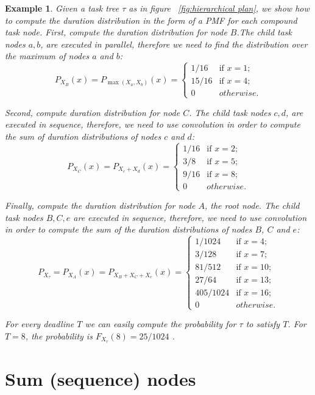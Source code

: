 \documentclass[review]{elsarticle}
\newtheorem{example}{Example}
\begin{document}
\begin{example}

Given a task tree $\tau$ as in figure ~\ref{fig:hierarchical plan}, we show how to compute the duration distribution in the form of a  PMF for each compound task node. 
First, compute the duration distribution for node $B$.The child task nodes $a,b$, are executed in parallel, therefore we need to find the distribution over the maximum of nodes $a$ and $b$:  
$$P_{X_B}(x)=P_{\max(X_a,X_b)}(x)=
\begin{cases}
1/16 & \text{if } x=1; \\
15/16 & \text{if } x=4; \\
0 & otherwise.
\end{cases}$$

Second, compute duration distribution for node $C$. The child task nodes $c,d$, are executed in sequence, therefore, we need to use convolution in order to compute the sum of duration distributions of nodes $c$ and $d$:  
$$P_{X_C}(x)=P_{X_c+X_d}(x)=
\begin{cases}
1/16 & \text{if } x=2; \\
3/8 & \text{if } x=5; \\
9/16 & \text{if } x=8; \\
0 & otherwise.
\end{cases}$$

Finally, compute the duration distribution for node $A$, the root node. The child task nodes $B,C,e$ are executed in sequence, therefore, we need to use convolution in order to compute the sum of the duration distributions of nodes $B$, $C$ and $e$: 
$$P_{X_{\tau}}=P_{X_A}(x)=P_{X_B+X_C+X_e}(x)=
\begin{cases}
1/1024 & \text{if } x=4; \\
3/128 & \text{if } x=7; \\
81/512 & \text{if } x=10; \\
27/64 & \text{if } x=13; \\
405/1024 & \text{if } x=16; \\
0 & otherwise.
\end{cases}$$

For every deadline $T$ we can easily compute the probability for $\tau$ to satisfy $T$. For $T=8$, the probability is  $F_{X_{\tau}}(8)=25/1024$ . 
\end{example}
 
\section{Sum (sequence) nodes}\label{sec:seq}
\end{document}
